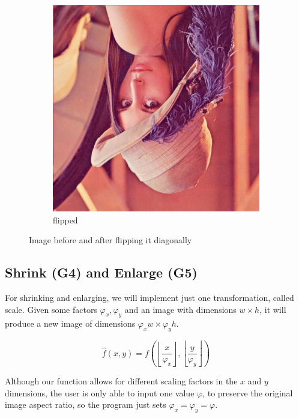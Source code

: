 \documentclass[12pt]{article}
\newcommand{\subfiguresize}{.3\textwidth}
\begin{document}
\begin{figure}[H]
\begin{subfigure}[t]{\subfiguresize}
        \includegraphics[width=\textwidth]{lenac_dflip.png}
        \caption{flipped}
    \end{subfigure}
    \caption{Image before and after flipping it diagonally}
\end{figure}

\subsection*{Shrink (G4) and Enlarge (G5)}

For shrinking and enlarging, we will implement just one transformation, called scale.
Given some factors $\varphi_x, \varphi_y$ and an image with dimensions $w \times h$, it will produce a new image of dimensions $\varphi_x w \times \varphi_y h$.

\begin{equation}
    \hat{f}(x,y) =
    f\left(
    \left\lfloor
    \frac{x}{\varphi_x}
    \right\rfloor,
    \left\lfloor
    \frac{y}{\varphi_y}
    \right\rfloor
    \right)
\end{equation}

Although our function allows for different scaling factors
in the $x$ and $y$ dimensions,
the user is only able to input one value $\varphi$,
to preserve the original image aspect ratio,
so the program just sets $\varphi_x = \varphi_y = \varphi$.
\end{document}
